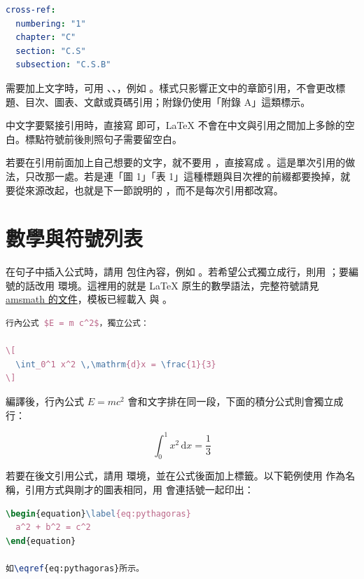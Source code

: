 \begin{lstlisting}[language=yaml]
cross-ref:
  numbering: "1"
  chapter: "C"
  section: "C.S"
  subsection: "C.S.B"
\end{lstlisting}

需要加上文字時，可用 、、，例如 。樣式只影響正文中的章節引用，不會更改標題、目次、圖表、文獻或頁碼引用；附錄仍使用「附錄 A」這類標示。

中文字要緊接引用時，直接寫  即可，\LaTeX{} 不會在中文與引用之間加上多餘的空白。標點符號前後則照句子需要留空白。

若要在引用前面加上自己想要的文字，就不要用 \code{\figref}，直接寫成 。這是單次引用的做法，只改那一處。若是連「圖 1」「表 1」這種標題與目次裡的前綴都要換掉，就要從來源改起，也就是下一節說明的 ，而不是每次引用都改寫。

\section{數學與符號列表}

在句子中插入公式時，請用  包住內容，例如 。若希望公式獨立成行，則用 \code{\[ ... \]}；要編號的話改用  環境。這裡用的就是 \LaTeX{} 原生的數學語法，完整符號請見 \href{https://ctan.org/pkg/amsmath}{amsmath 的文件}，模板已經載入  與 。

\begin{lstlisting}[language=latex]
行內公式 $E = m c^2$，獨立公式：

\[
  \int_0^1 x^2 \,\mathrm{d}x = \frac{1}{3}
\]
\end{lstlisting}

編譯後，行內公式 $E = m c^2$ 會和文字排在同一段，下面的積分公式則會獨立成行：

\[ \int_0^1 x^2 \,\mathrm{d}x = \frac{1}{3} \]

若要在後文引用公式，請用  環境，並在公式後面加上標籤。以下範例使用  作為名稱，引用方式與剛才的圖表相同，用 \code{\eqref} 會連括號一起印出：

\begin{lstlisting}[language=latex]
\begin{equation}\label{eq:pythagoras}
  a^2 + b^2 = c^2
\end{equation}

如\eqref{eq:pythagoras}所示。
\end{lstlisting}

